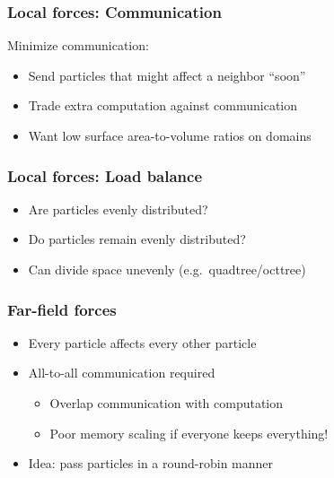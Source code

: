 \documentclass{beamer}
\begin{document}
\begin{frame}
  \frametitle{Local forces: Communication}

  \begin{center}
    
  \end{center}

  Minimize communication:
  \begin{itemize}
  \item Send particles that might affect a neighbor ``soon''
  \item Trade extra computation against communication
  \item Want low surface area-to-volume ratios on domains
  \end{itemize}
  
\end{frame}



\begin{frame}
  \frametitle{Local forces: Load balance}

  \begin{center}
    
  \end{center}

  \begin{itemize}
  \item Are particles evenly distributed?
  \item Do particles remain evenly distributed?
  \item Can divide space unevenly (e.g.~quadtree/octtree)
  \end{itemize}
  
\end{frame}


\begin{frame}
  \frametitle{Far-field forces}

  \begin{center}
    
  \end{center}

  \begin{itemize}
  \item Every particle affects every other particle
  \item All-to-all communication required
    \begin{itemize}
    \item Overlap communication with computation
    \item Poor memory scaling if everyone keeps everything!
    \end{itemize}
  \item Idea: pass particles in a round-robin manner
  \end{itemize}
\end{frame}
\end{document}
